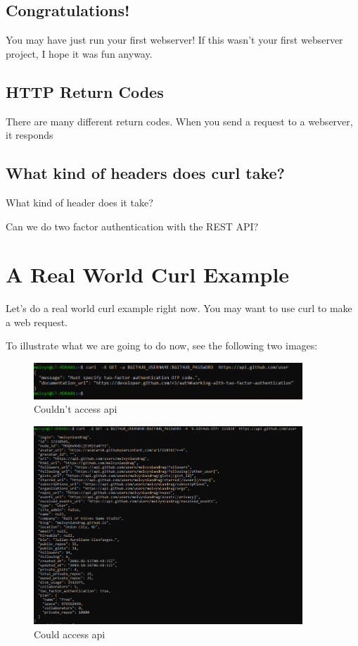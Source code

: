 \documentclass[10pt]{article}
\begin{document}
\subsection{Congratulations!}
You may have just run your first webserver! If this wasn't your first webserver project, I hope it was fun anyway.

\subsection{HTTP Return Codes}
There are many different return codes. When you send a request to a webserver, it responds


\subsection{What kind of headers does curl take?}
What kind of header does it take?

Can we do two factor authentication with the REST API?

\section{A Real World Curl Example}
Let's do a real world curl example right now. You may want to use curl to make a web request.

To illustrate what we are going to do now, see the following two images:

\begin{figure}[h]
  \centering
    \includegraphics[width=0.9\textwidth]{unsuccessfulGithubAPIHit.png}
  \caption{Couldn't access api}
\end{figure}

\begin{figure}[h]
  \centering
    \includegraphics[width=0.9\textwidth]{successfulGithubAPIHit.png}
  \caption{Could access api}
\end{figure}
\end{document}
